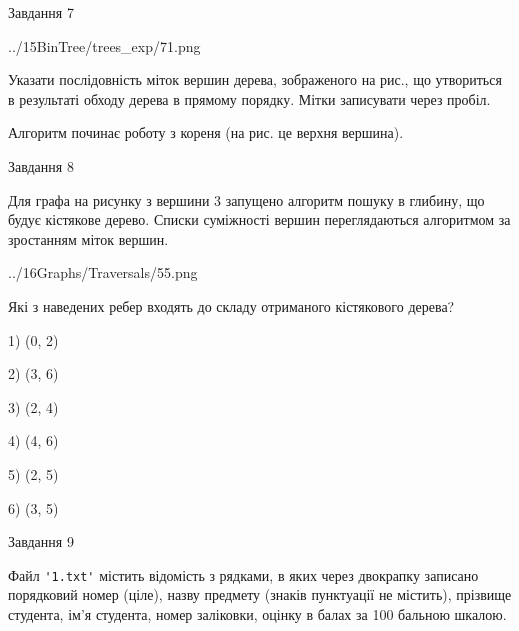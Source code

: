 \documentclass[12pt, ukrainian]{article}
\def\code#1{\Verb!#1!}
\begin{document}
{\vspace{10mm}\par

\newpage
\begin{minipage}[t]{9.7cm}
               
{\begin{center}Завдання {7}\end{center}}
\vspace{-4mm}

\begin{center}
	{../15BinTree/trees_exp/71.png}
\end{center}
Указати послідовність міток вершин дерева, зображеного на рис., що утвориться в результаті обходу дерева в прямому порядку. Мітки записувати через пробіл.\par Алгоритм починає роботу з кореня (на рис. це верхня вершина).\par

\end{minipage}
\vline \hspace{8mm}
\begin{minipage}[t]{8.0cm}
               
{\begin{center}Завдання {8}\end{center}}
\vspace{-4mm}
Для графа на рисунку з вершини 3 запущено алгоритм пошуку в глибину, що будує кістякове дерево. Списки суміжності вершин переглядаються алгоритмом за зростанням міток вершин.\par
\begin{center}
	{../16Graphs/Traversals/55.png}
\end{center}
\par Які з наведених ребер входять до складу отриманого кістякового дерева?\par
1) (0, 2)\par
2) (3, 6)\par
3) (2, 4)\par
4) (4, 6)\par
5) (2, 5)\par
6) (3, 5)\par
{\vskip 15pt} \par

\end{minipage}

               
{\begin{center}Завдання {9}\end{center}}
\vspace{-4mm}
Файл \code{'1.txt'} містить відомість з рядками, в яких через двокрапку записано поряд\-ковий номер (ціле), назву предмету (знаків пунктуації не містить), прізвище студента, ім'я студента, номер заліковки, оцінку в балах за 100 бальною шкалою.

}
\end{document}
